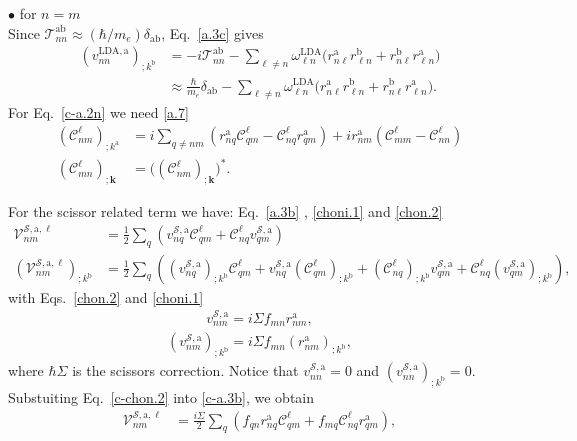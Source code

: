 $\bullet$ for $n=m$\\
Since 
$\mathcal{T}^{\mathrm{a}\mathrm{b}}_{nn}\approx (\hbar/m_e)\delta_{\mathrm{a}\mathrm{b}}$,
Eq.~\eqref{a.3c} gives
\begin{align}\label{c-a.3c}
(v^{\mathrm{LDA},\mathrm{a}}_{nn})_{;k^\mathrm{b}}
&=
-i\mathcal{T}^{\mathrm{a}\mathrm{b}}_{nn}
-
\sum_{\ell\ne n}
\omega^\mathrm{LDA}_{\ell n}
\bigg( 
r^{\mathrm{a}}_{n\ell} 
r^\mathrm{b}_{\ell n}
+ 
r^\mathrm{b}_{n\ell} 
r^{\mathrm{a}}_{\ell n}
\bigg)
\nonumber\\
&\approx
\frac{\hbar}{m_e}\delta_{\mathrm{a}\mathrm{b}}
-
\sum_{\ell\ne n}
\omega^\mathrm{LDA}_{\ell n}
\bigg( 
r^{\mathrm{a}}_{n\ell} 
r^\mathrm{b}_{\ell n}
+ 
r^\mathrm{b}_{n\ell} 
r^{\mathrm{a}}_{\ell n}
\bigg)
.
\end{align} 
For Eq.~\eqref{c-a.2n} we need
\eqref{a.7}
\begin{align}\label{c-a.7}
 (\mathcal{C}^\ell_{nm})_{;k^\mathrm{a}}
&= 
i\sum_{q\ne nm}
\left(
r_{nq}^\mathrm{a}
\mathcal{C}^\ell_{qm}
-
\mathcal{C}^\ell_{nq}
r_{qm}^\mathrm{a}
\right)
+ir_{nm}^\mathrm{a}(\mathcal{C}^\ell_{mm}-\mathcal{C}^\ell_{nn})
\nonumber\\
 (\mathcal{C}^\ell_{mn})_{;\mathbf{k}}
&=
\big( (\mathcal{C}^\ell_{nm})_{;\mathbf{k}}\big)^*
.
\end{align} 

For the scissor related term we have:
Eq.~\eqref{a.3b} , \eqref{choni.1} and \eqref{chon.2}
\begin{align}\label{c-a.3b}
\mathcal{V}^{\mathcal{S},\mathrm{a},\ell}_{nm}
&=
\frac{1}{2}\sum_q\left(    
v^{\mathcal{S},\mathrm{a}}_{nq}\mathcal{C}^\ell_{qm}+\mathcal{C}^\ell_{nq} v^{\mathcal{S},\mathrm{a}}_{qm}
\right)
\nonumber\\
\left(\mathcal{V}^{\mathcal{S},\mathrm{a},\ell}_{nm}\right)_{;k^\mathrm{b}}
&=
\frac{1}{2}\sum_q\left(
(v^{\mathcal{S},\mathrm{a}}_{nq})_{;k^\mathrm{b}}\mathcal{C}^\ell_{qm}
+     
v^{\mathcal{S},\mathrm{a}}_{nq}(\mathcal{C}^\ell_{qm})_{;k^\mathrm{b}}
+
(\mathcal{C}^\ell_{nq})_{;k^\mathrm{b}} v^{\mathcal{S},\mathrm{a}}_{qm}
+
\mathcal{C}^\ell_{nq} (v^{\mathcal{S},\mathrm{a}}_{qm})_{;k^\mathrm{b}}
\right)
,
\end{align}     
with Eqs.~\eqref{chon.2} and \eqref{choni.1}
\begin{align}\label{c-chon.2} 
v^{\mathcal{S},\mathrm{a}}_{nm}=i\Sigma f_{mn}r^\mathrm{a}_{nm}
,
\end{align}
\begin{align}\label{c-choni.1}
(v^{\mathcal{S},\mathrm{a}}_{nm})_{;k^\mathrm{b}}= 
i\Sigma f_{mn}(r^\mathrm{a}_{nm})_{;k^\mathrm{b}}
,
\end{align} 
where $\hbar\Sigma$ is the scissors correction.
Notice that
$v^{\mathcal{S},\mathrm{a}}_{nn}=0$ and 
$(v^{\mathcal{S},\mathrm{a}}_{nn})_{;k^\mathrm{b}}=0$.
Substuiting Eq.~\eqref{c-chon.2} into \eqref{c-a.3b}, we obtain
\begin{align}\label{c-a.3bb}
\mathcal{V}^{\mathcal{S},\mathrm{a},\ell}_{nm}
&=
\frac{i\Sigma}{2}\sum_q\left(  
f_{qn}r^\mathrm{a}_{nq}\mathcal{C}^\ell_{qm}+f_{mq}\mathcal{C}^\ell_{nq} r^\mathrm{a}_{qm}
\right)
,
\end{align}   

